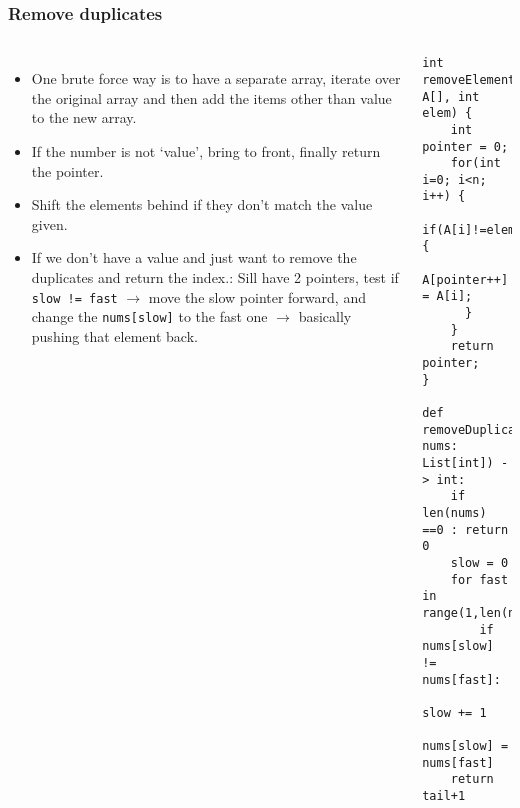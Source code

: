 \begin{frame}[fragile]
	\frametitle{Remove duplicates}
	
	\begin{columns}[T]
			\begin{itemize}
				\item  One brute force way is to have a separate array, iterate over the original array and 
then add the items other than value to the new array.
				\item If the number is not ‘value’, bring to front, finally return the pointer. 
\item Shift the elements behind if they don’t match the value given.  
\item If we don’t have a value and just want to remove the duplicates and return the index.: Sill have 2 pointers, test if \lstinline|slow != fast| $\rightarrow$ move the slow pointer forward, and change the 
\lstinline|nums[slow]| to the fast one $\rightarrow$ basically pushing that element back. 
			\end{itemize}
			
		
\begin{lstlisting}
int removeElement(int A[], int elem) { 
    int pointer = 0; 
    for(int i=0; i<n; i++) { 
      if(A[i]!=elem) { 
        A[pointer++] = A[i]; 
      } 
    } 
    return pointer; 
}  	

def removeDuplicates(self, nums: List[int]) -> int: 
    if len(nums) ==0 : return 0 
    slow = 0 
    for fast in range(1,len(nums)): 
        if nums[slow] != nums[fast]: 
            slow += 1 
            nums[slow] = nums[fast] 
    return tail+1 			
\end{lstlisting}			
	\end{columns}
\end{frame}


